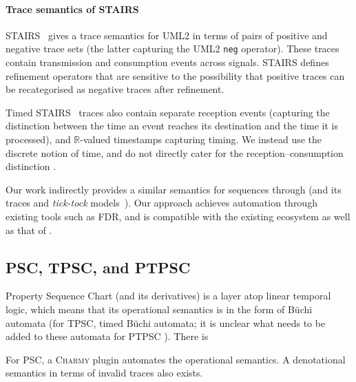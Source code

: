 \paragraph{Trace semantics of STAIRS}

STAIRS~\cite{Haugen03-STAIRS} gives a trace semantics for UML2 in terms
of pairs of positive and negative trace sets (the latter capturing the UML2
\texttt{neg} operator).  These traces contain
transmission and consumption events across signals.  STAIRS defines
refinement operators that are sensitive to the possibility that positive
traces can be recategorised as negative traces after refinement.

Timed
STAIRS~\cite{Haugen05-TimedSTAIRS} traces also contain separate reception
events (capturing the distinction between the time an event reaches
its destination and the time it is processed), and \(\mathbb R\)-valued
timestamps capturing timing.  We instead use the discrete \tockcsp{} notion
of time, and do not directly cater for the reception--consumption distinction
.

Our work indirectly provides a similar semantics for \langname{}
sequences through \tockcsp{} (and its traces and \emph{tick-tock} models~\cite{Baxter21-TickTock}).
Our approach achieves automation through existing tools such as FDR,
and is compatible with the existing \robostar{} ecosystem as well as that of
\tockcsp.

\subsection{PSC, TPSC, and PTPSC}

Property Sequence Chart (and its derivatives) is a layer atop
linear temporal logic, which means that its operational semantics is
in the form of B\"uchi automata (for TPSC, timed B\"uchi
automata; it is unclear what needs to be added to these automata for PTPSC ).
There is 

For PSC, a \textsc{Charmy} plugin automates the operational semantics.  A denotational semantics in terms of
invalid traces also exists.